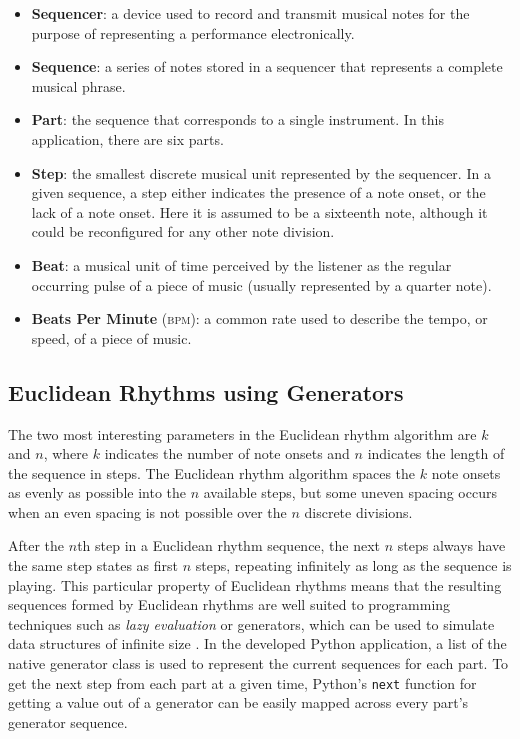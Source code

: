 \documentclass{sig-alternate-05-2015}
\begin{document}
\begin{itemize}
\item \textbf{Sequencer}: a device used to record and transmit musical notes for the purpose of representing a performance electronically.
\item \textbf{Sequence}: a series of notes stored in a sequencer that represents a complete musical phrase. 
\item \textbf{Part}: the sequence that corresponds to a single instrument. In this application, there are six parts.
\item \textbf{Step}: the smallest discrete musical unit represented by the sequencer. In a given sequence, a step either indicates the presence of a note onset, or the lack of a note onset. Here it is assumed to be a sixteenth note, although it could be reconfigured for any other note division. 
\item \textbf{Beat}:  a musical unit of time perceived by the listener as the regular occurring pulse of a piece of music (usually represented by a quarter note).
\item \textbf{Beats Per Minute} (\textsc{bpm}): a common rate used to describe the tempo, or speed, of a piece of music.
\end{itemize}

\subsection{Euclidean Rhythms using Generators}
The two most interesting parameters in the Euclidean rhythm algorithm are $k$ and $n$, where $k$ indicates the number of note onsets and $n$ indicates the length of the sequence in steps. The Euclidean rhythm algorithm spaces the $k$ note onsets as evenly as possible into the $n$ available steps, but some uneven spacing occurs when an even spacing is not possible over the $n$ discrete divisions. 

After the $n$th step in a Euclidean rhythm sequence, the next $n$ steps always have the same step states as first $n$ steps, repeating infinitely as long as the sequence is playing. This particular property of Euclidean rhythms means that the resulting sequences formed by Euclidean rhythms are well suited to programming techniques such as \textit{lazy evaluation} or generators, which can be used to simulate data structures of infinite size \cite{henderson1976lazy}. In the developed Python application, a list of the native generator class is used to represent the current sequences for each part. To get the next step from each part at a given time, Python's \texttt{next} function for getting a value out of a generator can be easily mapped across every part's generator sequence.
\end{document}
